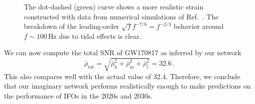 \documentclass[amsmath,amssymb,aps,floats,amsfonts,notitlepage,superscriptaddress,eqsecnum,nofootinbib,10pt]{revtex4-1}
\newcommand{\be}{\begin{equation}}
\newcommand{\ee}{\end{equation}}
\begin{document}
\begin{figure}[h!]
{%
The dot-dashed (green) curve shows a more realistic strain constructed with data from numerical simulations of Ref.~\cite{Read:2009yp}.
The breakdown of the leading-order $\sqrt{f}f^{-7/6}=f^{-2/3}$ behavior around $f\sim100\,$Hz due to tidal effects is clear.
}
\label{fig:figGW170817}
\end{figure}
%
%


We can now compute the total SNR of GW170817 as inferred by our network
%
\be
\bar\rho_\text{tot}= \sqrt{\bar\rho^2_h+\bar\rho^2_m+\bar\rho^2_l}= 32.6 \, \label{eq:SNR_total_GW170817} .
\ee
%
This also compares well with the actual value of 32.4. Therefore, we conclude that our imaginary network performs realistically enough to make predictions on the performance of IFOs in the 2020s and 2030s.
%
%
%
%
%
\end{document}
